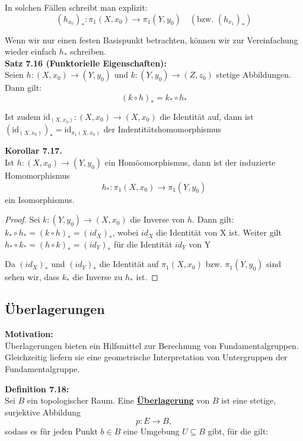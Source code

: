 \documentclass[fleqn, 12pt, letterpaper]{article}
\newcommand{\txt}[1]{\text{#1}}
\begin{document}
In solchen Fällen schreibt man explizit:
\[
(h_{x_0})_* : \pi_1(X, x_0) \longrightarrow \pi_1(Y, y_0) \quad (\txt{bzw. } (h_{x_1})_*)
\]

Wenn wir nur einen festen Basispunkt betrachten, können wir zur Vereinfachung wieder einfach \( h_* \) schreiben.\\

\textbf{Satz 7.16 (Funktorielle Eigenschaften):} \\
Seien \( h : (X, x_0) \to (Y, y_0) \) und \( k : (Y, y_0) \to (Z, z_0) \) stetige Abbildungen. Dann gilt:
\[
(k \circ h)_* = k_* \circ h_*
\]

Ist zudem \( \text{id}_{(X,x_0)}:(X,x_0)\to(X,x_0) \) die Identität auf, dann ist
\(
(\text{id}_{(X,x_0)})_* = \text{id}_{\pi_1(X, x_0)}
\) der Indentitätshomomorphismus

\vspace{1em}
\textbf{Korollar 7.17.} \\
Ist \( h : (X, x_0) \to (Y, y_0) \) ein Homöomorphismus, dann ist der induzierte Homomorphismus
\[
h_* : \pi_1(X, x_0) \to \pi_1(Y, y_0)
\]
ein Isomorphismus.

\begin{proof}
Sei \( k : (Y, y_0) \to (X, x_0) \) die Inverse von \( h \). Dann gilt:
\(
k_* \circ h_* =(k\circ h)_*=(id_X)_*
\), wobei $id_X$ die Identität von X ist. Weiter gilt \(
h_* \circ k_* =(h\circ k)_*=(id_Y)_*
\) für die Identität $id_Y$ von Y

Da $(id_X)_*$ und $(id_Y)_*$ die Identität auf $\pi_1(X,x_0)$ bzw. $\pi_1(Y,y_0)$ sind sehen wir, dass $k_*$ die Inverse zu $h_*$ ist.
\end{proof}


\subsection{Überlagerungen}

\textbf{Motivation:} \\
Überlagerungen bieten ein Hilfsmittel zur Berechnung von Fundamentalgruppen. \\
Gleichzeitig liefern sie eine geometrische Interpretation von Untergruppen der Fundamentalgruppe.

\vspace{1em}
\textbf{Definition 7.18:} \\
Sei \( B \) ein topologischer Raum. Eine \textbf{\underline{Überlagerung}} von \( B \) ist eine stetige, surjektive Abbildung
\[
p : E \to B,
\]
sodass es für jeden Punkt \( b \in B \) eine Umgebung \( U \subseteq B \) gibt, für die gilt:
\end{document}

